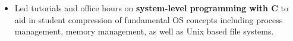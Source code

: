 \documentclass[10pt,a4paper]{altacv}
\begin{document}
\divider

\begin{itemize}  
\item Led tutorials and office hours on \textbf{system-level programming with C} to aid in student compression of fundamental OS concepts including process management, memory management, as well as Unix based file systems.
\end{itemize}
\end{document}

